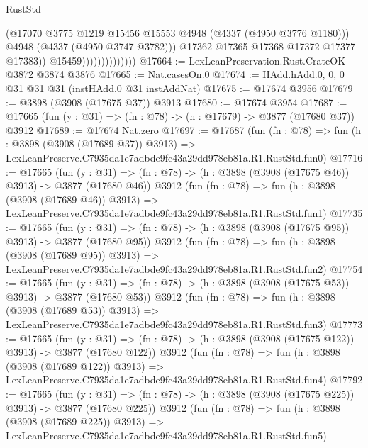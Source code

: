 \begin{lexlean}{RustStd}
\begin{coremodule}
                                      (@17070
                                        @3775
                                        @1219
                                        @15456
                                        @15553
                                        @4948
                                        (@4337 (@4950 @3776 @1180)))
                                      @4948
                                      (@4337 (@4950 @3747 @3782)))
                                    @17362
                                    @17365
                                    @17368
                                    @17372
                                    @17377
                                    @17383))
                                @15459))))))))))))))
@17664 := LexLeanPreservation.Rust.CrateOK @3872 @3874 @3876
@17665 := Nat.casesOn.{0}
@17674 := HAdd.hAdd.{0, 0, 0} @31 @31 @31 (instHAdd.{0} @31 instAddNat)
@17675 := @17674 @3956
@17679 := @3898 (@3908 (@17675 @37)) @3913
@17680 := @17674 @3954
@17687 := @17665 (fun (y : @31) => (fn : @78) -> (h : @17679) -> @3877 (@17680 @37)) @3912
@17689 := @17674 Nat.zero
@17697 := @17687
    (fun (fn : @78) =>
    fun (h : @3898 (@3908 (@17689 @37)) @3913) =>
    LexLeanPreserve.C7935da1e7adbde9fc43a29dd978eb81a.R1.RustStd.fun0)
@17716 := @17665
    (fun (y : @31) => (fn : @78) -> (h : @3898 (@3908 (@17675 @46)) @3913) -> @3877 (@17680 @46))
    @3912
    (fun (fn : @78) =>
    fun (h : @3898 (@3908 (@17689 @46)) @3913) =>
    LexLeanPreserve.C7935da1e7adbde9fc43a29dd978eb81a.R1.RustStd.fun1)
@17735 := @17665
    (fun (y : @31) => (fn : @78) -> (h : @3898 (@3908 (@17675 @95)) @3913) -> @3877 (@17680 @95))
    @3912
    (fun (fn : @78) =>
    fun (h : @3898 (@3908 (@17689 @95)) @3913) =>
    LexLeanPreserve.C7935da1e7adbde9fc43a29dd978eb81a.R1.RustStd.fun2)
@17754 := @17665
    (fun (y : @31) => (fn : @78) -> (h : @3898 (@3908 (@17675 @53)) @3913) -> @3877 (@17680 @53))
    @3912
    (fun (fn : @78) =>
    fun (h : @3898 (@3908 (@17689 @53)) @3913) =>
    LexLeanPreserve.C7935da1e7adbde9fc43a29dd978eb81a.R1.RustStd.fun3)
@17773 := @17665
    (fun (y : @31) => (fn : @78) -> (h : @3898 (@3908 (@17675 @122)) @3913) -> @3877 (@17680 @122))
    @3912
    (fun (fn : @78) =>
    fun (h : @3898 (@3908 (@17689 @122)) @3913) =>
    LexLeanPreserve.C7935da1e7adbde9fc43a29dd978eb81a.R1.RustStd.fun4)
@17792 := @17665
    (fun (y : @31) => (fn : @78) -> (h : @3898 (@3908 (@17675 @225)) @3913) -> @3877 (@17680 @225))
    @3912
    (fun (fn : @78) =>
    fun (h : @3898 (@3908 (@17689 @225)) @3913) =>
    LexLeanPreserve.C7935da1e7adbde9fc43a29dd978eb81a.R1.RustStd.fun5)

\end{coremodule}
\end{lexlean}
